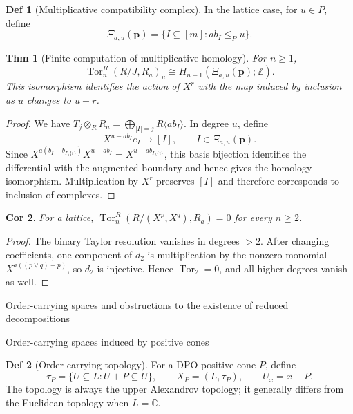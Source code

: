 \documentclass[10pt,letterpaper]{amsart}
\makeatletter
\numberwithin{equation}{section}
\newtheorem{thm}{Thm}[section]
\newtheorem{cor}[thm]{Cor}
\theoremstyle{definition}
\newtheorem{defn}{Def}[section]
\newcommand{\Z}{\mathbb Z}
\newcommand{\C}{\mathbb C}
\newcommand{\Tor}{\operatorname{Tor}}
\newcommand{\sh}[1]{\langle #1\rangle}
\def\section{\@startsection{section}{1}
  \z@{1.1\linespacing\@plus.5\linespacing}{.6\linespacing}
  {\normalfont\fontsize{13}{16}\selectfont\bfseries\boldmath\centering}}
\def\subsection{\@startsection{subsection}{2}
  \z@{.9\linespacing\@plus.3\linespacing}{.4\linespacing}
  {\normalfont\fontsize{11.5}{14}\selectfont\bfseries\boldmath\raggedright}}
\makeatother
\begin{document}
\begin{defn}[Multiplicative compatibility complex]\label{def:xi}
In the lattice case, for $u\in P$, define
\[
\Xi_{a,u}(\mathbf p)=\{I\subseteq[m]:a b_I\le_Pu\}.
\]
\end{defn}

\begin{thm}[Finite computation of multiplicative homology]\label{thm:xi}
For $n\ge1$,
\[
\Tor_n^R(R/J,R_a)_u
\cong\widetilde H_{n-1}(\Xi_{a,u}(\mathbf p);\Z).
\]
This isomorphism identifies the action of $X^r$ with the map induced by inclusion as $u$ changes to $u+r$.
\end{thm}
\begin{proof}
We have $T_j\otimes_RR_a=\bigoplus_{|I|=j}R\sh{ab_I}$. In degree $u$, define
\[
X^{u-ab_I}e_I\longmapsto[I],\qquad I\in\Xi_{a,u}(\mathbf p).
\]
Since $X^{a(b_I-b_{I\setminus\{i\}})}X^{u-ab_I}=X^{u-ab_{I\setminus\{i\}}}$, this basis bijection identifies the differential with the augmented boundary and hence gives the homology isomorphism. Multiplication by $X^r$ preserves $[I]$ and therefore corresponds to inclusion of complexes.
\end{proof}

\begin{cor}\label{cor:binary-high-vanish}
For a lattice, $\Tor_n^R(R/(X^p,X^q),R_a)=0$ for every $n\ge2$.
\end{cor}
\begin{proof}
The binary Taylor resolution vanishes in degrees $>2$. After changing coefficients, one component of $d_2$ is multiplication by the nonzero monomial $X^{a((p\vee q)-p)}$, so $d_2$ is injective. Hence $\Tor_2=0$, and all higher degrees vanish as well.
\end{proof}

\section{Order-carrying spaces and obstructions to the existence of reduced decompositions}
\subsection{Order-carrying spaces induced by positive cones}
\begin{defn}[Order-carrying topology]\label{def:carrier}
For a DPO positive cone $P$, define
\[
\tau_P=\{U\subseteq L:U+P\subseteq U\},\qquad X_P=(L,\tau_P),
\qquad U_x=x+P.
\]
The topology is always the upper Alexandrov topology; it generally differs from the Euclidean topology when $L=\C$.
\end{defn}
\end{document}
